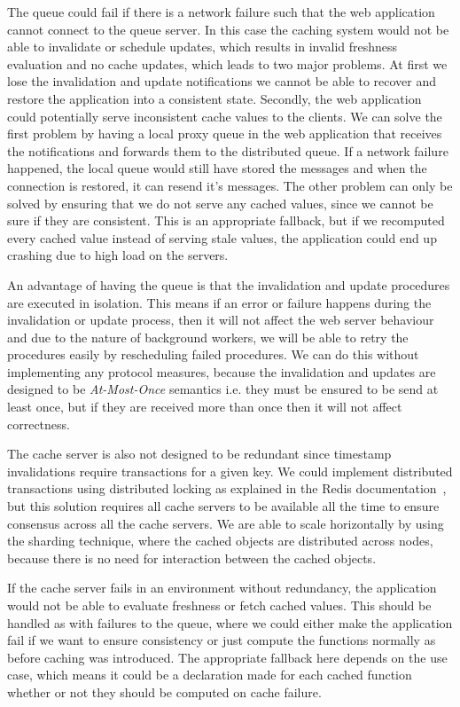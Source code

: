 The queue could fail if there is a network failure such that the web application cannot connect to the queue server. In this case the caching system would not be able to invalidate or schedule updates, which results in invalid freshness evaluation and no cache updates, which leads to two major problems. At first we lose the invalidation and update notifications we cannot be able to recover and restore the application into a consistent state. Secondly, the web application could potentially serve inconsistent cache values to the clients. We can solve the first problem by having a local proxy queue in the web application that receives the notifications and forwards them to the distributed queue. If a network failure happened, the local queue would still have stored the messages and when the connection is restored, it can resend it's messages. The other problem can only be solved by ensuring that we do not serve any cached values, since we cannot be sure if they are consistent. This is an appropriate fallback, but if we recomputed every cached value instead of serving stale values, the application could end up crashing due to high load on the servers.

An advantage of having the queue is that the invalidation and update procedures are executed in isolation. This means if an error or failure happens during the invalidation or update process, then it will not affect the web server behaviour and due to the nature of background workers, we will be able to retry the procedures easily by rescheduling failed procedures. We can do this without implementing any protocol measures, because the invalidation and updates are designed to be \emph{At-Most-Once} semantics i.e. they must be ensured to be send at least once, but if they are received more than once then it will not affect correctness.

The cache server is also not designed to be redundant since timestamp invalidations require transactions for a given key. We could implement distributed transactions using distributed locking as explained in the Redis documentation~\cite{docs:redis-locking}, but this solution requires all cache servers to be available all the time to ensure consensus across all the cache servers. We are able to scale horizontally by using the sharding technique, where the cached objects are distributed across nodes, because there is no need for interaction between the cached objects.

If the cache server fails in an environment without redundancy, the application would not be able to evaluate freshness or fetch cached values. This should be handled as with failures to the queue, where we could either make the application fail if we want to ensure consistency or just compute the functions normally as before caching was introduced. The appropriate fallback here depends on the use case, which means it could be a declaration made for each cached function whether or not they should be computed on cache failure.

